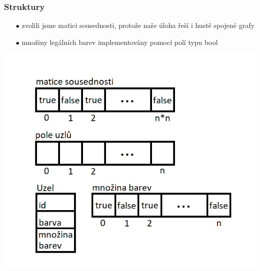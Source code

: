 \documentclass[10pt,xcolor=pdflatex]{beamer}
\begin{document}
\begin{frame}\frametitle{Struktury}
    \begin{itemize}
	\item[$\bullet$] zvolili jsme matici sousednosti, protože naše úloha řeší i hustě spojené grafy
	\item[$\bullet$] množiny legálních barev implementovány pomocí polí typu bool
	\end{itemize}
    \includegraphics[scale=0.58]{img/structures.png}
\end{frame}
\end{document}
